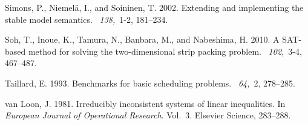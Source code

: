 \begin{thebibliography}{}
{\sc Simons, P.}, {\sc Niemelä, I.}, {\sc and} {\sc Soininen, T.} 2002.
\newblock Extending and implementing the stable model semantics.
~{\em 138,\/}~1-2, 181--234.

{\sc Soh, T.}, {\sc Inoue, K.}, {\sc Tamura, N.}, {\sc Banbara, M.}, {\sc and}
  {\sc Nabeshima, H.} 2010.
\newblock A {SAT}-based method for solving the two-dimensional strip packing
  problem.
~{\em 102,\/}~3-4, 467--487.

{\sc Taillard, E.} 1993.
\newblock Benchmarks for basic scheduling problems.
~{\em 64,\/}~2,
  278--285.

{\sc van Loon, J.} 1981.
\newblock Irreducibly inconsistent systems of linear inequalities.
\newblock In {\em European Journal of Operational Research}. Vol.~3. Elsevier
  Science, 283--288.

\end{thebibliography}

